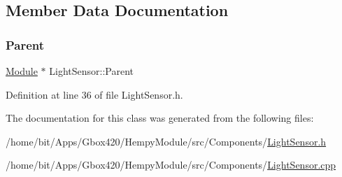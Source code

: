 \subsection{Member Data Documentation}
\mbox{\label{class_light_sensor_afc358d440691edea541b12acf84e53c9}} 
\subsubsection{\texorpdfstring{Parent}{Parent}}
{\footnotesize\ttfamily \hyperlink{class_module}{Module} $\ast$ Light\+Sensor\+::\+Parent\hspace{0.3cm}{\ttfamily [protected]}}



Definition at line 36 of file Light\+Sensor.\+h.



The documentation for this class was generated from the following files\+:\begin{DoxyCompactItemize}
\item 
/home/bit/\+Apps/\+Gbox420/\+Hempy\+Module/src/\+Components/\hyperlink{_hempy_module_2src_2_components_2_light_sensor_8h}{Light\+Sensor.\+h}\item 
/home/bit/\+Apps/\+Gbox420/\+Hempy\+Module/src/\+Components/\hyperlink{_hempy_module_2src_2_components_2_light_sensor_8cpp}{Light\+Sensor.\+cpp}\end{DoxyCompactItemize}
